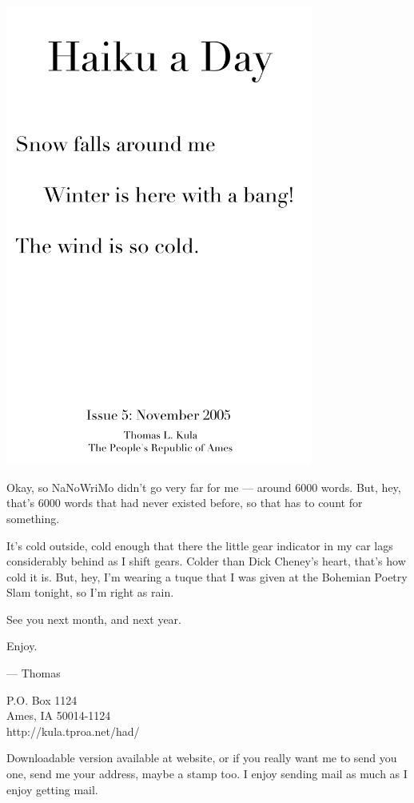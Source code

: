 \documentclass[12pt]{article}
\begin{document}
\includegraphics[width=101mm]{frontpage.png}

\newpage

Okay, so NaNoWriMo didn't go very far for me --- around 6000 words.
But, hey, that's 6000 words that had never existed before, so that
has to count for something.

It's cold outside, cold enough that there the little gear indicator
in my car lags considerably behind as I shift gears. Colder than
Dick Cheney's heart, that's how cold it is. But, hey, I'm wearing
a tuque that I was given at the Bohemian Poetry Slam tonight, so
I'm right as rain.

See you next month, and next year.

Enjoy.

--- Thomas

P.O. Box 1124 \\
Ames, IA 50014-1124 \\
http://kula.tproa.net/had/

Downloadable version available at website, or if you really
want me to send you one, send me your address, maybe a
stamp too. I enjoy sending mail as much as I enjoy getting
mail.\\
\end{document}
